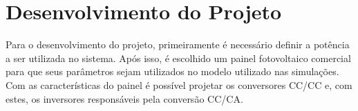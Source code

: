\documentclass[
	12pt,				%
	openright,			%
	twoside,			%
	a4paper,			%
	english,			%
	french,				%
	spanish,			%
	brazil,				%
	]{abntex2}
\begin{document}


 




\chapter{Desenvolvimento do Projeto}  \label{cap:project}

Para o desenvolvimento do projeto, primeiramente é necessário definir a potência a ser utilizada no sistema. Após isso, é escolhido um painel fotovoltaico comercial para que seus parâmetros sejam utilizados no modelo utilizado nas simulações. Com as características do painel é possível projetar os conversores CC/CC e, com estes, os inversores responsáveis pela conversão CC/CA.
\end{document}

